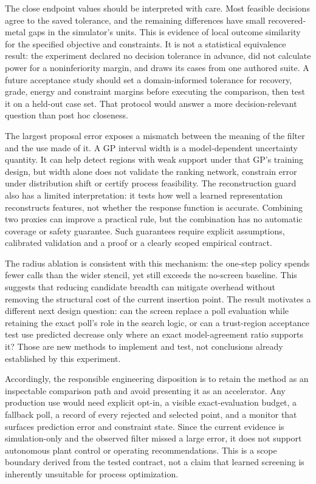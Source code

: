\documentclass[10pt]{article}
\begin{document}
The close endpoint values should be interpreted with care. Most feasible decisions agree to the saved tolerance, and the remaining differences have small recovered-metal gaps in the simulator's units. This is evidence of local outcome similarity for the specified objective and constraints. It is not a statistical equivalence result: the experiment declared no decision tolerance in advance, did not calculate power for a noninferiority margin, and draws its cases from one authored suite. A future acceptance study should set a domain-informed tolerance for recovery, grade, energy and constraint margins before executing the comparison, then test it on a held-out case set. That protocol would answer a more decision-relevant question than post hoc closeness.

The largest proposal error exposes a mismatch between the meaning of the filter and the use made of it. A GP interval width is a model-dependent uncertainty quantity. It can help detect regions with weak support under that GP's training design, but width alone does not validate the ranking network, constrain error under distribution shift or certify process feasibility. The reconstruction guard also has a limited interpretation: it tests how well a learned representation reconstructs features, not whether the response function is accurate. Combining two proxies can improve a practical rule, but the combination has no automatic coverage or safety guarantee. Such guarantees require explicit assumptions, calibrated validation and a proof or a clearly scoped empirical contract.

The radius ablation is consistent with this mechanism: the one-step policy spends fewer calls than the wider stencil, yet still exceeds the no-screen baseline. This suggests that reducing candidate breadth can mitigate overhead without removing the structural cost of the current insertion point. The result motivates a different next design question: can the screen replace a poll evaluation while retaining the exact poll's role in the search logic, or can a trust-region acceptance test use predicted decrease only where an exact model-agreement ratio supports it? Those are new methods to implement and test, not conclusions already established by this experiment.

Accordingly, the responsible engineering disposition is to retain the method as an inspectable comparison path and avoid presenting it as an accelerator. Any production use would need explicit opt-in, a visible exact-evaluation budget, a fallback poll, a record of every rejected and selected point, and a monitor that surfaces prediction error and constraint state. Since the current evidence is simulation-only and the observed filter missed a large error, it does not support autonomous plant control or operating recommendations. This is a scope boundary derived from the tested contract, not a claim that learned screening is inherently unsuitable for process optimization.
\end{document}
